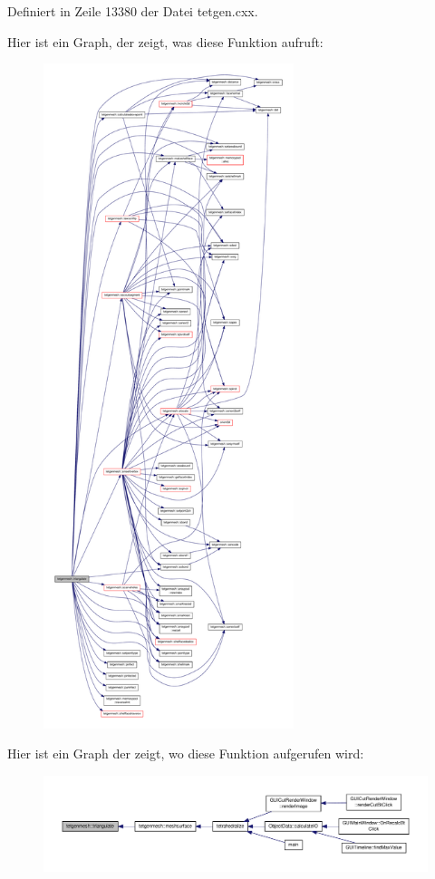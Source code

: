 Definiert in Zeile 13380 der Datei tetgen.\-cxx.



Hier ist ein Graph, der zeigt, was diese Funktion aufruft\-:\nopagebreak
\begin{figure}[H]
\begin{center}
\leavevmode
\includegraphics[height=550pt]{classtetgenmesh_af62b4d5ed09b5a10704caf321e9c5b06_cgraph}
\end{center}
\end{figure}




Hier ist ein Graph der zeigt, wo diese Funktion aufgerufen wird\-:\nopagebreak
\begin{figure}[H]
\begin{center}
\leavevmode
\includegraphics[width=350pt]{classtetgenmesh_af62b4d5ed09b5a10704caf321e9c5b06_icgraph}
\end{center}
\end{figure}


